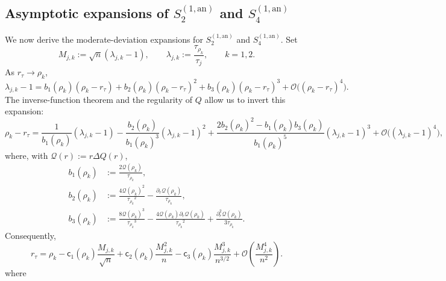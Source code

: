 \documentclass[a4paper]{article}
\numberwithin{equation}{section}
\begin{document}


\subsection{Asymptotic expansions of \texorpdfstring{$S_2^{(1,\mathrm{an})}$ and $S_4^{(1,\mathrm{an})}$}{S2(1) and S4(1)}}
We now derive the moderate-deviation expansions for $S_2^{(1,\mathrm{an})}$ and $S_4^{(1,\mathrm{an})}$. Set
\begin{equation}
\label{def of Mjk lambda jk}
M_{j,k}:=\sqrt{n}(\lambda_{j,k}-1),\qquad \lambda_{j,k}:=\frac{\tau_{\rho_k}}{\tau_j},\qquad k=1,2.
\end{equation}
As $r_\tau\to\rho_k$,
\[
\lambda_{j,k}-1=b_1(\rho_k)(\rho_k-r_{\tau})+b_2(\rho_k)(\rho_k-r_{\tau})^2+b_3(\rho_k)(\rho_k-r_{\tau})^3+\mathcal{O}\bigl((\rho_k-r_{\tau})^4 \bigr).
\]
The inverse-function theorem and the regularity of $Q$ allow us to invert this expansion:
\[
\rho_k-r_{\tau}
=\frac{1}{b_1(\rho_k)}(\lambda_{j,k}-1)-\frac{b_2(\rho_k)}{b_1(\rho_k)^3}(\lambda_{j,k}-1)^2
+\frac{2b_2(\rho_k)^2-b_1(\rho_k)b_3(\rho_k)}{b_1(\rho_k)^5}(\lambda_{j,k}-1)^3+\mathcal{O}\bigl((\lambda_{j,k}-1)^4\bigr),
\]
where, with $\mathcal Q(r):=r\Delta Q(r)$,
\begin{align*}
b_1(\rho_k)&:=\frac{2\mathcal{Q}(\rho_k)}{\tau_{\rho_k}},
\\
b_2(\rho_k)&:=\frac{4\mathcal{Q}(\rho_k)^2}{{{\tau_{\rho_k}}^2}}-\frac{\partial_r\mathcal{Q}(\rho_k)}{\tau_{\rho_k}},
\\
b_3(\rho_k)&:=\frac{8\mathcal{Q}(\rho_k)^3}{{\tau_{\rho_k}}^3}-\frac{4\mathcal{Q}(\rho_k)\partial_r\mathcal{Q}(\rho_k)}{{\tau_{\rho_k}}^2}+\frac{\partial_r^2\mathcal{Q}(\rho_k)}{3\tau_{\rho_k}}.
\end{align*}
Consequently,
\begin{equation}
r_{\tau}
=\rho_k-\mathsf{c}_1(\rho_k)\frac{M_{j,k}}{\sqrt{n}}+\mathsf{c}_2(\rho_k)\frac{M_{j,k}^2}{n}-\mathsf{c}_3(\rho_k)\frac{M_{j,k}^3}{n^{3/2}}+\mathcal{O}(\frac{M_{j,k}^4}{n^2}).
\end{equation}
where
\end{document}
